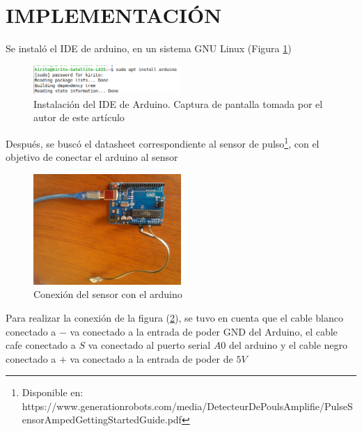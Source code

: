 \documentclass[letterpaper, 10 pt, conference]{ieeeconf}  %
\begin{document}
\section{IMPLEMENTACI\'ON}

Se instal\'o el IDE de arduino, en un sistema GNU Linux (Figura \ref{fig:ide})\\

\begin{figure}
\centering
\includegraphics[width=0.5\textwidth]{installArduino.png}
\caption{Instalaci\'on del IDE de Arduino. Captura de pantalla tomada por el autor de este art\'iculo}
\label{fig:ide}
\end{figure}

Despu\'es, se busc\'o el datasheet correspondiente al sensor de pulso\footnote{Disponible en: https://www.generationrobots.com/media/DetecteurDePoulsAmplifie/PulseSensorAmpedGettingStartedGuide.pdf}, con el objetivo de conectar el arduino al sensor\\

\begin{figure}
\centering
\includegraphics[width=0.5\textwidth]{arduinoUno.jpeg}
\caption{Conexi\'on del sensor con el arduino}
\label{fig:arduinoConnected}
\end{figure}

Para realizar la conexi\'on de la figura (\ref{fig:arduinoConnected}), se tuvo en cuenta que el cable blanco conectado a $-$ va conectado a la entrada de poder GND del Arduino, el cable cafe conectado a $S$ va conectado al puerto serial $A0$ del arduino y el cable negro conectado a $+$ va conectado a la entrada de poder de $5V$\\
\end{document}
